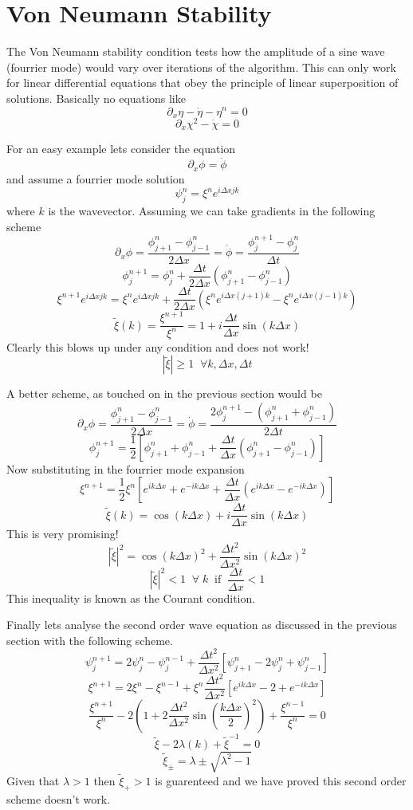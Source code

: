 \documentclass[11pt, oneside]{report}  %
\numberwithin{equation}{section}
\begin{document}
\section{Von Neumann Stability}
The Von Neumann stability condition tests how the amplitude of a sine wave (fourrier mode) would vary over iterations of the algorithm. This can only work for linear differential equations that obey the principle of linear superposition of solutions. Basically no equations like 
$$ \partial_x \eta - \dot \eta - \eta^n = 0$$
$$ \partial_x \chi^2 - \dot \chi =0$$

For an easy example lets consider the equation 
$$ \partial_x \phi = \dot \phi$$
and assume a fourrier mode solution 
$$ \psi^n_j = \xi^n e^{i\Delta x j k} $$
where $k$ is the wavevector. Assuming we can take gradients in the following scheme
$$ \partial_x \phi = \frac{ \phi^n_{j+1} - \phi^n_{j-1}}{2\Delta x} = \dot \phi = \frac{\phi^{n+1}_j - \phi^n_j}{\Delta t}$$
$$ \phi^{n+1}_j = \phi^n_j + \frac{\Delta t}{2 \Delta x}\left( \phi^n_{j+1} - \phi^n_{j-1}\right)$$
$$ \xi^{n+1} e^{i\Delta x j k} = \xi^n e^{i\Delta x j k} + \frac{\Delta t}{2 \Delta x}\left( \xi^n e^{i\Delta x (j+1) k} - \xi^n e^{i\Delta x (j-1) k}\right) $$
$$\boxed{\tilde\xi(k) = \frac{\xi^{n+1}}{\xi^n} = 1 + i\frac{\Delta t}{\Delta x} \sin \left( k\Delta x\right)} $$
Clearly this blows up under any condition and does not work!
 $$|\tilde \xi| \geq 1 \;\; \forall k,\Delta x,\Delta t$$
 
 A better scheme, as touched on in the previous section would be 
 $$ \partial_x \phi = \frac{ \phi^n_{j+1} - \phi^n_{j-1}}{2\Delta x} = \dot \phi = \frac{2\phi^{n+1}_j - (\phi^n_{j+1}+\phi^n_{j-1})}{2\Delta t}$$
 $$\boxed{\phi^{n+1}_j = \frac{1}{2}\left[\phi^{n}_{j+1}+\phi^{n}_{j-1} + \frac{\Delta t}{\Delta x}\left( \phi^n_{j+1}-\phi^n_{j-1}\right) \right]}$$
 Now substituting in the fourrier mode expansion
 $$\xi^{n+1} = \frac{1}{2}\xi^n\left[e^{ik\Delta x}+e^{-ik\Delta x} + \frac{\Delta t}{\Delta x}\left( e^{ik\Delta x}-e^{-ik\Delta x}\right) \right] $$
 $$\boxed{\tilde\xi(k) = \cos(k\Delta x) + i\frac{\Delta t}{\Delta x}\sin(k\Delta x)} $$
 This is very promising!
 $$ |\tilde \xi|^2 = \cos(k\Delta x)^2 + \frac{\Delta t^2}{\Delta x^2}\sin(k\Delta x)^2$$
 $$ |\tilde \xi|^2 < 1 \;\; \forall \;k \;\; \mathrm{if} \;\; \frac{\Delta t}{\Delta x} < 1$$
 This inequality is known as the Courant condition.
 
 Finally lets analyse the second order wave equation as discussed in the previous section with the following scheme.
 $$ \psi^{n+1}_j = 2\psi^n_j - \psi^{n-1}_j+ \frac{\Delta t^2}{\Delta x^2}\left[ \psi^n_{j+1}-2\psi^n_j + \psi^n_{j-1}\right]$$
 $$ \xi^{n+1} = 2\xi^n - \xi^{n-1} + \xi^n \frac{\Delta t^2}{\Delta x^2}\left[ e^{ik\Delta x}-2 + e^{-ik\Delta x}\right]$$
 $$ \frac{\xi^{n+1}}{\xi^n} -2\left( 1+ 2\frac{\Delta t^2}{\Delta x^2}\sin(\frac{k\Delta x}{2})^2\right) + \frac{\xi^{n-1}}{\xi^n}=0$$
 $$ \tilde \xi - 2\lambda(k) + \tilde \xi^{-1}=0$$
 $$ \tilde\xi_{\pm} = \lambda \pm \sqrt{\lambda^2-1}$$
 Given that $\lambda > 1$ then $\tilde\xi_+ > 1$ is guarenteed and we have proved this second order scheme doesn't work.
\end{document}
